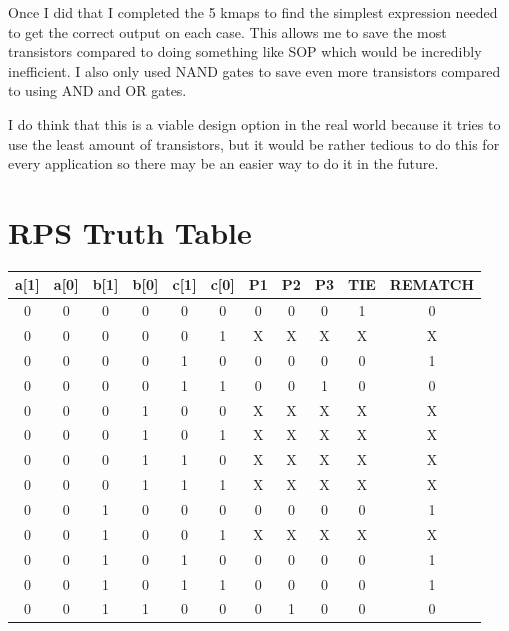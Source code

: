 \documentclass{article}
\begin{document}
Once I did that I completed the 5 kmaps to find the simplest expression needed to get the correct output on each case. This allows me to save the most transistors compared to doing something like SOP which would be incredibly inefficient. I also only used NAND gates to save even more transistors compared to using AND and OR gates.

I do think that this is a viable design option in the real world because it tries to use the least amount of transistors, but it would be rather tedious to do this for every application so there may be an easier way to do it in the future.
\newpage
\section{RPS Truth Table}

\begin{center}
    \renewcommand{\arraystretch}{.95}
    \begin{tabular}{c|c|c|c|c|c|c|c|c|c|c}
        a[1] & a[0] & b[1] & b[0] & c[1] & c[0] & P1 & P2 &  P3 & TIE & REMATCH \\
        \hline
        0  &  0  &  0  &  0  &  0  &  0  &  0  &  0  &  0  &  1  &  0 \\
        0  &  0  &  0  &  0  &  0  &  1  &  X  &  X  &  X  &  X  &  X \\
        0  &  0  &  0  &  0  &  1  &  0  &  0  &  0  &  0  &  0  &  1 \\
        0  &  0  &  0  &  0  &  1  &  1  &  0  &  0  &  1  &  0  &  0 \\
        0  &  0  &  0  &  1  &  0  &  0  &  X  &  X  &  X  &  X  &  X \\
        0  &  0  &  0  &  1  &  0  &  1  &  X  &  X  &  X  &  X  &  X \\
        0  &  0  &  0  &  1  &  1  &  0  &  X  &  X  &  X  &  X  &  X \\
        0  &  0  &  0  &  1  &  1  &  1  &  X  &  X  &  X  &  X  &  X \\
        0  &  0  &  1  &  0  &  0  &  0  &  0  &  0  &  0  &  0  &  1 \\
        0  &  0  &  1  &  0  &  0  &  1  &  X  &  X  &  X  &  X  &  X \\
        0  &  0  &  1  &  0  &  1  &  0  &  0  &  0  &  0  &  0  &  1 \\
        0  &  0  &  1  &  0  &  1  &  1  &  0  &  0  &  0  &  0  &  1 \\
        0  &  0  &  1  &  1  &  0  &  0  &  0  &  1  &  0  &  0  &  0 \\

\end{tabular}
\end{center}
\end{document}
